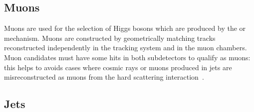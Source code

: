 \subsection{Muons}

Muons are used for the selection of Higgs bosons which are produced by the \ZH or \WH mechanism. Muons are constructed by geometrically matching tracks reconstructed independently in the tracking system and in the muon chambers. Muon candidates must have some hits in both subdetectors to qualify as \PF muons: this helps to avoids cases where cosmic rays or muons produced in jets are misreconstructed as muons from the hard scattering interaction~\cite{MuonReco}.

\subsection{Jets}
\label{reco:sec:jets}

